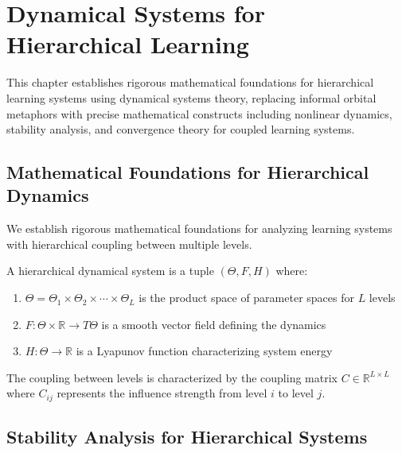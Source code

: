 \chapter{Dynamical Systems for Hierarchical Learning}

\begin{tcolorbox}[colback=DarkSkyBlue!5!white,colframe=DarkSkyBlue!75!black,title=Chapter Summary]
This chapter establishes rigorous mathematical foundations for hierarchical learning systems using dynamical systems theory, replacing informal orbital metaphors with precise mathematical constructs including nonlinear dynamics, stability analysis, and convergence theory for coupled learning systems.
\end{tcolorbox}

\section{Mathematical Foundations for Hierarchical Dynamics}

We establish rigorous mathematical foundations for analyzing learning systems with hierarchical coupling between multiple levels.

\begin{definition}
\label{def:hierarchical_dynamical_system}
A hierarchical dynamical system is a tuple $(\Theta, F, H)$ where:
\begin{enumerate}
\item $\Theta = \Theta_1 \times \Theta_2 \times \cdots \times \Theta_L$ is the product space of parameter spaces for $L$ levels
\item $F: \Theta \times \mathbb{R} \to T\Theta$ is a smooth vector field defining the dynamics
\item $H: \Theta \to \mathbb{R}$ is a Lyapunov function characterizing system energy
\end{enumerate}
\end{definition}

\begin{definition}
\label{def:coupling_structure}
The coupling between levels is characterized by the coupling matrix $C \in \mathbb{R}^{L \times L}$ where $C_{ij}$ represents the influence strength from level $i$ to level $j$.
\end{definition}

\section{Stability Analysis for Hierarchical Systems}

